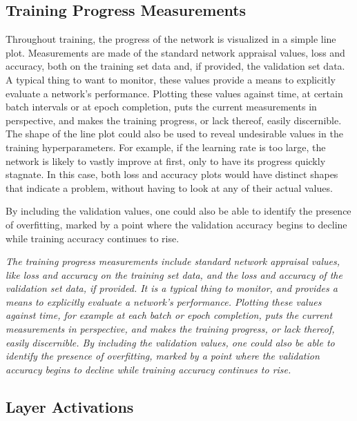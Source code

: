 \subsection{Training Progress Measurements}

Throughout training, the progress of the network is visualized in a simple line plot. Measurements are made of the standard network appraisal values, loss and accuracy, both on the training set data and, if provided, the validation set data. A typical thing to want to monitor, these values provide a means to explicitly evaluate a network’s performance. Plotting these values against time, at certain batch intervals or at epoch completion, puts the current measurements in perspective, and makes the training progress, or lack thereof, easily discernible. The shape of the line plot could also be used to reveal undesirable values in the training hyperparameters. For example, if the learning rate is too large, the network is likely to vastly improve at first, only to have its progress quickly stagnate. In this case, both loss and accuracy plots would have distinct shapes that indicate a problem, without having to look at any of their actual values.

By including the validation values, one could also be able to identify the presence of overfitting, marked by a point where the validation accuracy begins to decline while training accuracy continues to rise.

\textit{The training progress measurements include standard network appraisal values, like loss and accuracy on the training set data, and the loss and accuracy of the validation set data, if provided. It is a typical thing to monitor, and provides a means to explicitly evaluate a network’s performance. Plotting these values against time, for example at each batch or epoch completion, puts the current measurements in perspective, and makes the training progress, or lack thereof, easily discernible. By including the validation values, one could also be able to identify the presence of overfitting, marked by a point where the validation accuracy begins to decline while training accuracy continues to rise.}

\subsection{Layer Activations}

